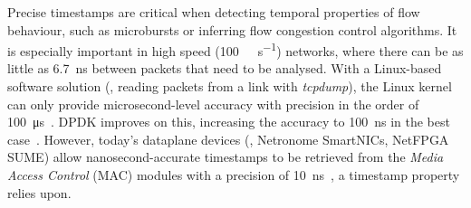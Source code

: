 Precise timestamps are critical when detecting temporal properties of flow behaviour, such as microbursts or inferring flow congestion control algorithms.
It is especially important in high speed (\SI{100}{\giga\bit\per\second}) networks, where there can be as little as \SI{6.7}{\nano\second} between packets that need to be analysed.
With a Linux-based software solution (\eg, reading packets from a link with \emph{tcpdump}), the Linux kernel can only provide microsecond-level accuracy with precision in the order of \SI{100}{\micro\second}~\cite{kundel2020p4sta}.
DPDK improves on this, increasing the accuracy to \SI{100}{\nano\second} in the best case~\cite{primorac2017measure}.
However, today's dataplane devices (\eg, Netronome SmartNICs, NetFPGA SUME) allow nanosecond-accurate timestamps to be retrieved from the \emph{Media Access Control} (MAC) modules with a precision of \SI{10}{\nano\second}~\cite{kundel2020p4sta}, a timestamp property \seidr{} relies upon.


